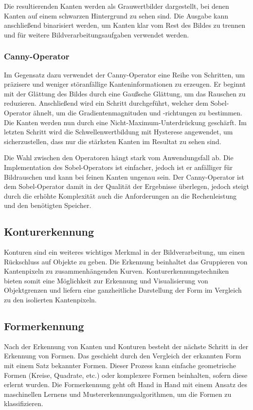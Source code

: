 Die resultierenden Kanten werden als Grauwertbilder dargestellt, 
bei denen Kanten auf einem schwarzen Hintergrund zu sehen sind. Die Ausgabe kann anschließend binarisiert werden, 
um Kanten klar vom Rest des Bildes zu trennen und für weitere Bildverarbeitungsaufgaben verwendet werden.~\cite{AHMED_SHIHAB_AHMED_2018_jatit}

\subsubsection{Canny-Operator}
Im Gegensatz dazu verwendet der Canny-Operator eine Reihe von Schritten, um präzisere und weniger störanfällige Kanteninformationen zu erzeugen.
Er beginnt mit der Glättung des Bildes durch eine Gaußsche Glättung, um das Rauschen zu reduzieren. Anschließend wird ein Schritt durchgeführt, 
welcher dem Sobel-Operator ähnelt, um die Gradientenmagnituden und -richtungen zu bestimmen. Die Kanten werden nun durch eine Nicht-Maximum-Unterdrückung
geschärft. Im letzten Schritt wird die Schwellenwertbildung mit Hysterese angewendet, um sicherzustellen, dass nur die stärksten Kanten im Resultat 
zu sehen sind.

Die Wahl zwischen den Operatoren hängt stark vom Anwendungsfall ab. Die Implementation des Sobel-Operators ist einfacher, jedoch ist er anfälliger 
für Bildrauschen und kann bei feinen Kanten ungenau sein. Der Canny-Operator ist dem Sobel-Operator damit in der Qualität der Ergebnisse überlegen,
jedoch steigt durch die erhöhte Komplexität auch die Anforderungen an die Rechenleistung und den benötigten Speicher.~\cite{AHMED_SHIHAB_AHMED_2018_jatit}

\subsection{Konturerkennung}
Konturen sind ein weiteres wichtiges Merkmal in der Bildverarbeitung, um einen Rückschluss auf Objekte zu geben. Die Erkennung beinhaltet das 
Gruppieren von Kantenpixeln zu zusammenhängenden Kurven. Konturerkennungstechniken bieten somit eine Möglichkeit zur Erkennung und Visualisierung
von Objektgrenzen und liefern eine ganzheitliche Darstellung der Form im Vergleich zu den isolierten Kantenpixeln.~\cite{Xin-Yi_Gong_2018_springer}

\subsection{Formerkennung}
Nach der Erkennung von Kanten und Konturen besteht der nächste Schritt in der Erkennung von Formen. Das geschieht durch den
Vergleich der erkannten Form mit einem Satz bekannter Formen. Dieser Prozess kann einfache geometrische Formen (Kreise, Quadrate, etc.) 
oder komplexere Formen beinhalten, sofern diese erlernt wurden. Die Formerkennung geht oft Hand in Hand mit einem Ansatz des maschinellen Lernens
und Mustererkennungsalgorithmen, um die Formen zu klassifizieren.~\cite{Sambarta_Dasgupta_2009_springer}

